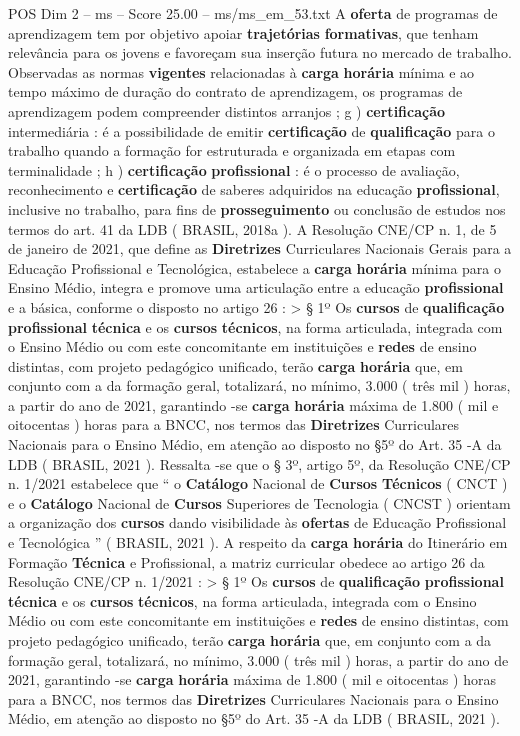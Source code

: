 \begin{textsample}{POS Dim 2 – ms – Score 25.00 – ms/ms\_em\_53.txt}
A \textbf{oferta} de programas de aprendizagem tem por objetivo apoiar \textbf{trajetórias} \textbf{formativas}, que tenham relevância para os jovens e favoreçam sua inserção futura no mercado de trabalho.
Observadas as normas \textbf{vigentes} relacionadas à \textbf{carga} \textbf{horária} mínima e ao tempo máximo de duração do contrato de aprendizagem, os programas de aprendizagem podem compreender distintos arranjos ; g ) \textbf{certificação} intermediária : é a possibilidade de emitir \textbf{certificação} de \textbf{qualificação} para o trabalho quando a formação for estruturada e organizada em etapas com terminalidade ; h ) \textbf{certificação} \textbf{profissional} : é o processo de avaliação, reconhecimento e \textbf{certificação} de saberes adquiridos na educação \textbf{profissional}, inclusive no trabalho, para fins de \textbf{prosseguimento} ou conclusão de estudos nos termos do art. 41 da LDB ( BRASIL, 2018a ).
A Resolução CNE/CP n. 1, de 5 de janeiro de 2021, que define as \textbf{Diretrizes} Curriculares Nacionais Gerais para a Educação Profissional e Tecnológica, estabelece a \textbf{carga} \textbf{horária} mínima para o Ensino Médio, integra e promove uma articulação entre a educação \textbf{profissional} e a básica, conforme o disposto no artigo 26 : > § 1º Os \textbf{cursos} de \textbf{qualificação} \textbf{profissional} \textbf{técnica} e os \textbf{cursos} \textbf{técnicos}, na forma articulada, integrada com o Ensino Médio ou com este concomitante em instituições e \textbf{redes} de ensino distintas, com projeto pedagógico unificado, terão \textbf{carga} \textbf{horária} que, em conjunto com a da formação geral, totalizará, no mínimo, 3.000 ( três mil ) horas, a partir do ano de 2021, garantindo -se \textbf{carga} \textbf{horária} máxima de 1.800 ( mil e oitocentas ) horas para a BNCC, nos termos das \textbf{Diretrizes} Curriculares Nacionais para o Ensino Médio, em atenção ao disposto no §5º do Art. 35 -A da LDB ( BRASIL, 2021 ).
Ressalta -se que o § 3º, artigo 5º, da Resolução CNE/CP n. 1/2021 estabelece que “ o \textbf{Catálogo} Nacional de \textbf{Cursos} \textbf{Técnicos} ( CNCT ) e o \textbf{Catálogo} Nacional de \textbf{Cursos} Superiores de Tecnologia ( CNCST ) orientam a organização dos \textbf{cursos} dando visibilidade às \textbf{ofertas} de Educação Profissional e Tecnológica ” ( BRASIL, 2021 ).
A respeito da \textbf{carga} \textbf{horária} do Itinerário em Formação \textbf{Técnica} e Profissional, a matriz curricular obedece ao artigo 26 da Resolução CNE/CP n. 1/2021 : > § 1º Os \textbf{cursos} de \textbf{qualificação} \textbf{profissional} \textbf{técnica} e os \textbf{cursos} \textbf{técnicos}, na forma articulada, integrada com o Ensino Médio ou com este concomitante em instituições e \textbf{redes} de ensino distintas, com projeto pedagógico unificado, terão \textbf{carga} \textbf{horária} que, em conjunto com a da formação geral, totalizará, no mínimo, 3.000 ( três mil ) horas, a partir do ano de 2021, garantindo -se \textbf{carga} \textbf{horária} máxima de 1.800 ( mil e oitocentas ) horas para a BNCC, nos termos das \textbf{Diretrizes} Curriculares Nacionais para o Ensino Médio, em atenção ao disposto no §5º do Art. 35 -A da LDB ( BRASIL, 2021 ).

\end{textsample}
